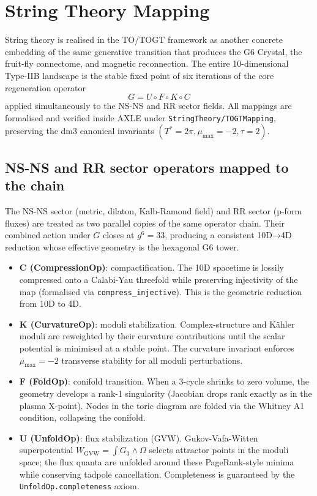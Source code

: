 \documentclass[19pt]{book}
\theoremstyle{plain}
\theoremstyle{definition}
\theoremstyle{remark}
\begin{document}
\chapter{String Theory Mapping}

String theory is realised in the TO/TOGT framework as another concrete embedding of the same generative transition that produces the G6 Crystal, the fruit-fly connectome, and magnetic reconnection. The entire 10-dimensional Type-IIB landscape is the stable fixed point of six iterations of the core regeneration operator
\[
G = U \circ F \circ K \circ C
\]
applied simultaneously to the NS-NS and RR sector fields. All mappings are formalised and verified inside AXLE under \texttt{StringTheory/TOGTMapping}, preserving the dm3 canonical invariants \((T^*=2\pi, \mu_{\max}=-2, \tau=2)\).

\section{NS-NS and RR sector operators mapped to the chain}

The NS-NS sector (metric, dilaton, Kalb-Ramond field) and RR sector (p-form fluxes) are treated as two parallel copies of the same operator chain. Their combined action under \(G\) closes at \(g^6=33\), producing a consistent 10D→4D reduction whose effective geometry is the hexagonal G6 tower.

\begin{itemize}
\item \textbf{C (CompressionOp)}: compactification. The 10D spacetime is lossily compressed onto a Calabi-Yau threefold while preserving injectivity of the map (formalised via \texttt{compress\_injective}). This is the geometric reduction from 10D to 4D.
\item \textbf{K (CurvatureOp)}: moduli stabilization. Complex-structure and Kähler moduli are reweighted by their curvature contributions until the scalar potential is minimised at a stable point. The curvature invariant enforces \(\mu_{\max}=-2\) transverse stability for all moduli perturbations.
\item \textbf{F (FoldOp)}: conifold transition. When a 3-cycle shrinks to zero volume, the geometry develops a rank-1 singularity (Jacobian drops rank exactly as in the plasma X-point). Nodes in the toric diagram are folded via the Whitney A1 condition, collapsing the conifold.
\item \textbf{U (UnfoldOp)}: flux stabilization (GVW). Gukov-Vafa-Witten superpotential \(W_{\text{GVW}} = \int G_3 \wedge \Omega\) selects attractor points in the moduli space; the flux quanta are unfolded around these PageRank-style minima while conserving tadpole cancellation. Completeness is guaranteed by the \texttt{UnfoldOp.completeness} axiom.
\end{itemize}
\end{document}
